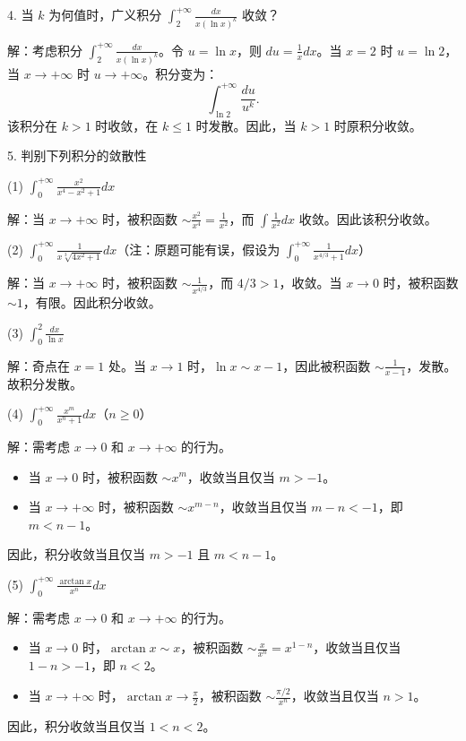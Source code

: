 4. 当 \(k\) 为何值时，广义积分 \(\int_{2}^{+\infty}\frac{dx}{x(\ln x)^{k}}\) 收敛？

解：考虑积分 \(\int_{2}^{+\infty}\frac{dx}{x(\ln x)^{k}}\)。令 \(u=\ln x\)，则 \(du=\frac{1}{x}dx\)。当 \(x=2\) 时 \(u=\ln2\)，当 \(x\to+\infty\) 时 \(u\to+\infty\)。积分变为：
\[ \int_{\ln2}^{+\infty}\frac{du}{u^{k}}. \]
该积分在 \(k>1\) 时收敛，在 \(k\le1\) 时发散。因此，当 \(k>1\) 时原积分收敛。

5. 判别下列积分的敛散性

(1) \(\int_{0}^{+\infty}\frac{x^{2}}{x^{4}-x^{2}+1}dx\)

解：当 \(x\to+\infty\) 时，被积函数 \(\sim\frac{x^{2}}{x^{4}}=\frac{1}{x^{2}}\)，而 \(\int\frac{1}{x^{2}}dx\) 收敛。因此该积分收敛。

(2) \(\int_{0}^{+\infty}\frac{1}{x\sqrt[3]{4x^{2}+1}}dx\)（注：原题可能有误，假设为 \(\int_{0}^{+\infty}\frac{1}{x^{4/3}+1}dx\)）

解：当 \(x\to+\infty\) 时，被积函数 \(\sim\frac{1}{x^{4/3}}\)，而 \(4/3>1\)，收敛。当 \(x\to0\) 时，被积函数 \(\sim1\)，有限。因此积分收敛。

(3) \(\int_{0}^{2}\frac{dx}{\ln x}\)

解：奇点在 \(x=1\) 处。当 \(x\to1\) 时，\(\ln x\sim x-1\)，因此被积函数 \(\sim\frac{1}{x-1}\)，发散。故积分发散。

(4) \(\int_{0}^{+\infty}\frac{x^{m}}{x^{n}+1}dx\)（\(n\ge0\)）

解：需考虑 \(x\to0\) 和 \(x\to+\infty\) 的行为。
\begin{itemize}
\item 当 \(x\to0\) 时，被积函数 \(\sim x^{m}\)，收敛当且仅当 \(m>-1\)。
\item 当 \(x\to+\infty\) 时，被积函数 \(\sim x^{m-n}\)，收敛当且仅当 \(m-n<-1\)，即 \(m<n-1\)。
\end{itemize}
因此，积分收敛当且仅当 \(m>-1\) 且 \(m<n-1\)。

(5) \(\int_{0}^{+\infty}\frac{\arctan x}{x^{n}}dx\)

解：需考虑 \(x\to0\) 和 \(x\to+\infty\) 的行为。
\begin{itemize}
\item 当 \(x\to0\) 时，\(\arctan x\sim x\)，被积函数 \(\sim\frac{x}{x^{n}}=x^{1-n}\)，收敛当且仅当 \(1-n>-1\)，即 \(n<2\)。
\item 当 \(x\to+\infty\) 时，\(\arctan x\to\frac{\pi}{2}\)，被积函数 \(\sim\frac{\pi/2}{x^{n}}\)，收敛当且仅当 \(n>1\)。
\end{itemize}
因此，积分收敛当且仅当 \(1<n<2\)。

